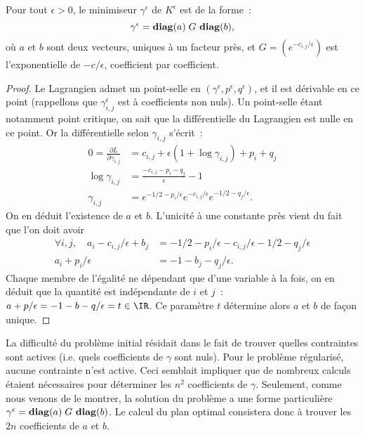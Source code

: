 \begin{lemma}
Pour tout $\epsilon > 0$, le minimiseur $\gamma^\epsilon$ de $K^\epsilon$ est de la forme~:
\begin{equation}\label{eq:aGb}
\gamma^\epsilon = \operatorname{\mathbf{diag}}(a)\;G\,\operatorname{\mathbf{diag}}(b) ,
\end{equation}
où $a$ et $b$ sont deux vecteurs, uniques à un facteur près, et $G = (e^{-c_{i,j}/\epsilon})$ est l'exponentielle de $-c/\epsilon$, coefficient par coefficient.
\end{lemma}
\begin{proof}
Le Lagrangien admet un point-selle en $(\gamma^\epsilon,p^\epsilon,q^\epsilon)$, et il est dérivable en ce point (rappellons que $\gamma^\epsilon_{i,j}$ est à coefficients non nuls). Un point-selle étant notamment point critique, on sait que la différentielle du Lagrangien est nulle en ce point. Or la différentielle selon $\gamma_{i,j}$ s'écrit~:
\[\begin{split}
0 = \frac{\partial L}{\partial \gamma_{i,j}}
&= c_{i,j} + \epsilon(1+\log \gamma_{i,j} ) + p_i + q_j \\
\log \gamma_{i,j} &= \frac{-c_{i,j} - p_i - q_j}{\epsilon} -1\\
\gamma_{i,j} &= e^{-1/2 - p_i / \epsilon} e^{-c_{i,j}/\epsilon} e^{-1/2 - q_j / \epsilon} .
\end{split}\]
On en déduit l'existence de $a$ et $b$. L'unicité à une constante près vient du fait que l'on doit avoir \[\begin{split}
\forall i,j,\quad
a_i - c_{i,j}/\epsilon + b_j &= -1/2 - p_i/\epsilon - c_{i,j} / \epsilon - 1/2 - q_j/ \epsilon \\
a_i + p_i/\epsilon &= -1 - b_j - q_j/\epsilon .
 \end{split}\]
Chaque membre de l'égalité ne dépendant que d'une variable à la fois, on en déduit que la quantité est indépendante de $i$ et $j$~: $a + p/\epsilon = -1-b-q/\epsilon = t \in \IR$. Ce paramètre $t$ détermine alors $a$ et $b$ de façon unique.
\end{proof}

La difficulté du problème initial résidait dans le fait de trouver quelles contraintes sont actives (i.e. quels coefficients de $\gamma$ sont nuls). Pour le problème régularisé, aucune contrainte n'est active. Ceci semblait impliquer que de nombreux calculs étaient nécessaires pour déterminer les $n^2$ coefficients de $\gamma$. Seulement, comme nous venons de le montrer, la solution du problème a une forme particulière $\gamma^\epsilon = \operatorname{\mathbf{diag}}(a)\;G\,\operatorname{\mathbf{diag}}(b)$. Le calcul du plan optimal consistera donc à trouver les $2n$ coefficients de $a$ et $b$.

